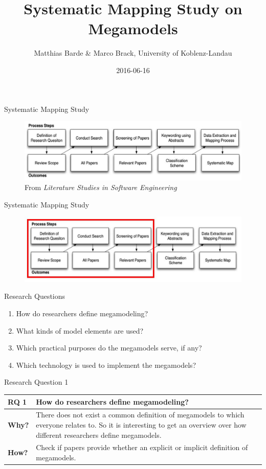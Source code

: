 \documentclass{beamer}
\title[Summary]{Systematic Mapping Study on Megamodels}
\author{Matthias Barde \& Marco Brack, University of Koblenz-Landau}
\institute{SLE course SS 2016 (\url{http://www.softlang.org/course:sle16})}
\date{2016-06-16}
\begin{document}
\begin{frame}
\titlepage
\end{frame}


\begin{frame}{Systematic Mapping Study}
\begin{figure}
	\includegraphics[width=1.0\textwidth]{sms_full}
	\caption{From \textit{Literature Studies in Software Engineering} \cite{litstud}}
\end{figure}
\end{frame}

\begin{frame}{Systematic Mapping Study}
\begin{figure}
	\includegraphics[width=1.0\textwidth]{sms_part_marked}
\end{figure}
\end{frame}

\begin{frame}{Research Questions}
\begin{enumerate}
	\item How do researchers define megamodeling?
	\item What kinds of model elements are used?
	\item Which practical purposes do the megamodels serve, if any?
	\item Which technology is used to implement the megamodels?	
\end{enumerate}
\end{frame}

\begin{frame}{Research Question 1}
\begin{tabular}{|l|p{9cm}|}\hline
\textbf{RQ 1} & How do researchers define megamodeling?\\\hline
\textbf{Why?} & There does not exist a common definition of me\-ga\-mo\-dels to which everyone relates to. So it is interesting to get an overview over how different researchers define megamodels.\\\hline
\textbf{How?} & Check if papers provide whether an explicit or implicit definition of megamodels.\\\hline
\end{tabular}
\end{frame}
\end{document}

